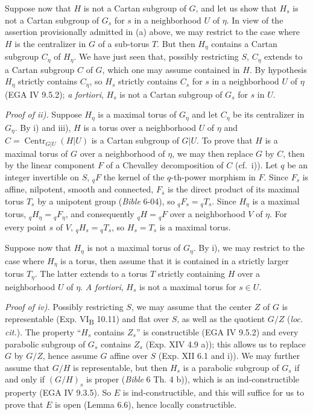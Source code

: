 Suppose now that \(H\) is not a Cartan subgroup of \(G\), and let us show that \(H_{s}\) is not a Cartan subgroup of \(G_{s}\)
for \(s\) in a neighborhood \(U\) of \(\eta\). In view of the assertion provisionally admitted in (a) above, we may restrict
to the case where \(H\) is the centralizer in \(G\) of a sub-torus \(T\). But then \(H_{\eta}\) contains a Cartan subgroup
\(C_{\eta}\) of \(H_{\eta}\). We have just seen that, possibly restricting \(S\), \(C_{\eta}\) extends to a Cartan subgroup \(C\)
of \(G\), which one may assume contained in \(H\). By hypothesis \(H_{\eta}\) strictly contains \(C_{\eta}\), so \(H_{s}\)
strictly contains \(C_{s}\) for \(s\) in a neighborhood \(U\) of \(\eta\) (EGA IV 9.5.2); \emph{a fortiori}, \(H_{s}\) is not
a Cartan subgroup of \(G_{s}\) for \(s\) in \(U\).

\emph{Proof of ii).} Suppose \(H_{\eta}\) is a maximal torus of \(G_{\eta}\) and let \(C_{\eta}\) be its centralizer in \(G_{\eta}\).
By i) and iii), \(H\) is a torus over a neighborhood \(U\) of \(\eta\) and \(C = \operatorname{Centr}_{G|U}(H|U)\) is a Cartan subgroup of
\(G|U\). To prove that \(H\) is a maximal torus of \(G\) over a neighborhood of \(\eta\), we may then replace \(G\) by \(C\), then
by the linear component \(F\) of a Chevalley decomposition of \(C\) (cf.~i)). Let \(q\) be an integer invertible on \(S\),
\({}_{q}F\) the kernel of the \(q\)-th-power morphism in \(F\). Since \(F_{s}\) is affine, nilpotent, smooth and connected,
\(F_{\bar s}\) is the direct product of its maximal torus \(T_{s}\) by a unipotent group (\emph{Bible} 6-04), so
\({}_{q}F_s={}_{q}T_s\). Since \(H_{\eta}\) is a maximal torus,
\({}_{q}H_{\eta}={}_{q}F_{\eta}\), and consequently
\({}_{q}H={}_{q}F\) over a neighborhood \(V\) of \(\eta\).
For every point \(s\) of \(V\), \({}_{q}H_s={}_{q}T_s\), so
\(H_{s} = T_{s}\) is a maximal torus.

Suppose now that \(H_{\eta}\) is not a maximal torus of \(G_{\eta}\). By i), we may restrict to the case where \(H_{\eta}\) is
a torus, then assume that it is contained in a strictly larger torus \(T_{\eta}\). The latter extends to a torus \(T\)
strictly containing \(H\) over a neighborhood \(U\) of \(\eta\). \emph{A fortiori}, \(H_{s}\) is not a maximal torus for \(s \in U\).

\emph{Proof of iv).} Possibly restricting \(S\), we may assume that the center \(Z\) of \(G\) is representable (Exp. VI\textsubscript{B} 10.11)
and flat over \(S\), as well as the quotient \(G/Z\) (\emph{loc. cit.}). The property ``\(H_{s}\) contains \(Z_{s}\)'' is
constructible (EGA IV 9.5.2) and every parabolic subgroup of \(G_{s}\) contains \(Z_{s}\) (Exp. XIV 4.9 a)); this allows us
to replace \(G\) by \(G/Z\), hence assume \(G\) affine over \(S\) (Exp. XII 6.1 and i)). We may further
assume that \(G/H\) is representable, but then \(H_{s}\) is a parabolic subgroup of \(G_{s}\) if and only if \((G/H)_{s}\) is
proper (\emph{Bible} 6 Th. 4 b)), which is an ind-constructible property (EGA IV 9.3.5). So \(E\) is ind-constructible, and
this will suffice for us to prove that \(E\) is open (Lemma 6.6), hence locally constructible.

